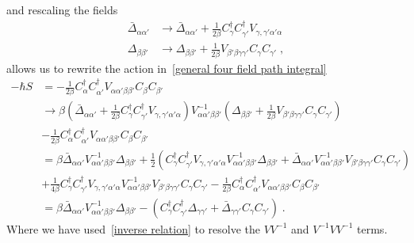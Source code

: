 \documentclass{article}
\begin{document}
and rescaling the fields
\begin{align}
    \bar{\Delta}_{\alpha \alpha'} &\rightarrow \bar{\Delta}_{\alpha \alpha'} + \frac{1}{2\beta}  C^{\dagger}_{\gamma} C^{\dagger}_{\gamma'} V_{\gamma,\gamma' \alpha' \alpha}\nonumber\\
         \Delta_{\beta \beta'}    &\rightarrow \Delta_{\beta \beta'} + \frac{1}{2\beta} V_{\beta' \beta \gamma \gamma'} C_{\gamma} C_{\gamma'}\label{rescaling hs-fields}\;,
\end{align}
allows us to rewrite the action in~\cref{general four field path integral} 
\begin{align}
     - \hbar S &= -\frac{1}{2\beta}C^{\dagger}_{\alpha} C^{\dagger}_{\alpha'} V_{\alpha \alpha' \beta \beta'} C_{\beta} C_{\beta'} \nonumber\\
       &\rightarrow \beta \left(\bar{\Delta}_{\alpha \alpha'} + \frac{1}{2 \beta} C^{\dagger}_{\gamma} C^{\dagger}_{\gamma'} V_{\gamma,\gamma' \alpha' \alpha}\right) V^{-1}_{\alpha \alpha' \beta \beta'} 
       \left(\Delta_{\beta \beta'} + \frac{1}{2 \beta} V_{\beta' \beta \gamma \gamma'} C_{\gamma} C_{\gamma'}\right) \nonumber \\
       &- \frac{1}{2\beta}C^{\dagger}_{\alpha} C^{\dagger}_{\alpha'} V_{\alpha \alpha' \beta \beta'} C_{\beta} C_{\beta'} \label{hs-transformation}\\
       &= \beta \bar{\Delta}_{\alpha \alpha'} V^{-1}_{\alpha \alpha' \beta \beta'} \Delta_{\beta \beta'} + \frac{1}{2}\left( C^{\dagger}_{\gamma} C^{\dagger}_{\gamma'} V_{\gamma,\gamma' \alpha' \alpha}  V^{-1}_{\alpha \alpha' \beta \beta'} \Delta_{\beta \beta'}+ \bar{\Delta}_{\alpha \alpha'} V^{-1}_{\alpha \alpha' \beta \beta'} V_{\beta' \beta \gamma \gamma'} C_{\gamma} C_{\gamma'}\right) \nonumber \\
       &+ \frac{1}{4\beta} C^{\dagger}_{\gamma} C^{\dagger}_{\gamma'} V_{\gamma,\gamma' \alpha' \alpha}  V^{-1}_{\alpha \alpha' \beta \beta'} V_{\beta' \beta \gamma \gamma'} C_{\gamma} C_{\gamma'}  - \frac{1}{2\beta}C^{\dagger}_{\alpha} C^{\dagger}_{\alpha'} V_{\alpha \alpha' \beta \beta'} C_{\beta} C_{\beta'} \nonumber\\
       &= \beta\bar{\Delta}_{\alpha \alpha'} V^{-1}_{\alpha \alpha' \beta \beta'} \Delta_{\beta \beta'} - \left( C^{\dagger}_{\gamma} C^{\dagger}_{\gamma'} \Delta_{\gamma \gamma'}+ \bar{\Delta}_{\gamma \gamma'}  C_{\gamma} C_{\gamma'}\right) \nonumber \;.
\end{align}
Where we have used~\cref{inverse relation} to resolve the $V V^{-1}$ and $V^{-1} V V^{-1}$ terms. 
\end{document}
